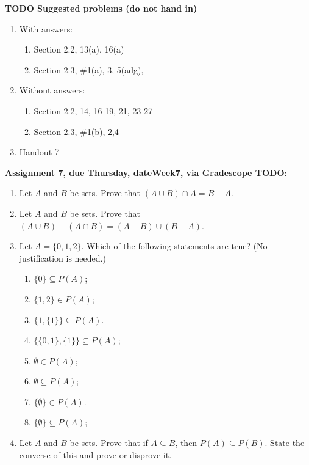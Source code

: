 \documentclass[12pt]{article}
\begin{document}

\noindent \textbf{TODO Suggested problems (do not hand in)}
 
\begin{enumerate}
\item With answers:
 \begin{enumerate}
 \item Section 2.2, 13(a), 16(a) 
 \item Section 2.3, \#1(a), 3, 5(adg),
 \end{enumerate}

\item Without answers:
 \begin{enumerate}
 \item Section 2.2, 14, 16-19, 21, 23-27
 \item Section 2.3, \#1(b), 2,4
 \end{enumerate}

 \item \href{https://www.math.emory.edu/~dzb/teaching/250Fall2021/handouts/250-H07-sets-II.pdf}{Handout 7}
\end{enumerate}


\noindent \textbf{Assignment 7, due Thursday, \csname dateWeek7\endcsname, via Gradescope TODO}:

\begin{enumerate}
\item Let $A$ and $B$ be sets. Prove that $(A \cup B) \cap \overline{A} = B - A$.
\item Let $A$ and $B$ be sets. Prove that $(A \cup B) - (A \cap B) = (A - B) \cup (B - A)$.
\item Let $A = \{0,1,2\}$. Which of the following statements are true? (No justification is needed.)

 \begin{enumerate}
 \item $\{0\} \subseteq P(A)$;\vspace{0.3cm}
 \item $\{1,2\} \in P(A)$;\vspace{0.3cm}
 \item $\{1,\{1\}\} \subseteq P(A)$.\\ 
 \item $\{\{0,1\},\{1\}\} \subseteq P(A)$;\vspace{0.3cm}
 \item $\emptyset \in P(A)$;\vspace{0.3cm}
 \item $\emptyset \subseteq P(A)$;\vspace{0.3cm}
 \item $\{\emptyset\} \in P(A)$. \vspace{0.3cm}
 \item $\{\emptyset\} \subseteq P(A)$;\vspace{0.3cm}

 \end{enumerate}
\item Let $A$ and $B$ be sets. Prove that if $A \subseteq B$, then $P(A) \subseteq P(B)$. State the converse of this and prove or disprove it.

\end{enumerate}
\end{document}
